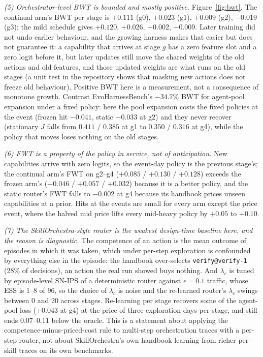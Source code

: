 \documentclass[10pt]{article}
\newcommand{\code}[1]{\texttt{#1}}
\begin{document}
\emph{(5) Orchestrator-level BWT is bounded and mostly positive.} Figure~\ref{fig:bwt}. The continual arm's BWT per stage is $+0.111$ (g0), $+0.023$ (g1), $+0.009$ (g2), $-0.019$ (g3); the mild schedule gives $+0.120$, $+0.026$, $+0.002$, $-0.009$. Later training did not undo earlier behaviour, and the growing harness makes that easier but does not guarantee it: a capability that arrives at stage $g$ has a zero feature slot and a zero logit before it, but later updates still move the shared weights of the old actions and old features, and those updated weights are what runs on the old stages (a unit test in the repository shows that masking new actions does not freeze old behaviour). Positive BWT here is a measurement, not a consequence of monotone growth. Contrast EvoHarnessBench's $-34.7\%$ BWT for agent-pool expansion under a fixed policy: here the pool expansion costs the fixed policies at the event (frozen hit $-0.041$, static $-0.033$ at g2) and they never recover (stationary $J$ falls from $0.411$ / $0.385$ at g1 to $0.350$ / $0.316$ at g4), while the policy that moves loses nothing on the old stages.

\emph{(6) FWT is a property of the policy in service, not of anticipation.} New capabilities arrive with zero logits, so the event-day policy is the previous stage's; the continual arm's FWT on g2--g4 ($+0.085$ / $+0.130$ / $+0.128$) exceeds the frozen arm's ($+0.046$ / $+0.057$ / $+0.032$) because it is a better policy, and the static router's FWT falls to $-0.002$ at g4 because its handbook prices unseen capabilities at a prior. Hits at the events are small for every arm except the price event, where the halved mid price lifts every mid-heavy policy by $+0.05$ to $+0.10$.

\emph{(7) The SkillOrchestra-style router is the weakest design-time baseline here, and the reason is diagnostic.} The competence of an action is the mean outcome of episodes in which it was taken, which under per-step exploration is confounded by everything else in the episode: the handbook over-selects \code{verify@verify-1} (28\% of decisions), an action the real run showed buys nothing. And $\lambda_c$ is tuned by episode-level SN-IPS of a deterministic router against $\epsilon=0.1$ traffic, whose ESS is 1--8 of 96, so the choice of $\lambda_c$ is noise and the re-learned router's $\lambda_c$ swings between 0 and 20 across stages. Re-learning per stage recovers some of the agent-pool loss ($+0.043$ at g4) at the price of three exploration days per stage, and still ends $0.07$--$0.11$ below the oracle. This is a statement about applying the competence-minus-priced-cost rule to multi-step orchestration traces with a per-step router, not about SkillOrchestra's own handbook learning from richer per-skill traces on its own benchmarks.
\end{document}
